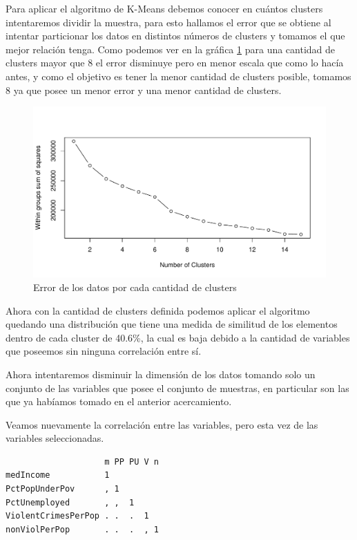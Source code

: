 \documentclass[a4paper,10pt,twocolumn]{article}
\begin{document}
	Para aplicar el algoritmo de K-Means debemos conocer en cuántos clusters intentaremos dividir la muestra, para esto hallamos el error que se obtiene al intentar particionar los datos en distintos números de clusters y tomamos el que mejor relación tenga. Como podemos ver en la gráfica \ref{fig:cluster_n_1} para una cantidad de clusters mayor que 8 el error disminuye pero en menor escala que como lo hacía antes, y como el objetivo es tener la menor cantidad de clusters posible, tomamos 8 ya que posee un menor error y una menor cantidad de clusters.

	\begin{figure}[htb]
		\begin{center}
			\includegraphics[width=\columnwidth]{figures/cluster_n_1.pdf}
		\end{center}
		\caption{Error de los datos por cada cantidad de clusters \label{fig:cluster_n_1}}%
	\end{figure}

	Ahora con la cantidad de clusters definida podemos aplicar el algoritmo quedando una distribución que tiene una medida de similitud de los elementos dentro de cada cluster de 40.6\%, la cual es baja debido a la cantidad de variables que poseemos sin ninguna correlación entre sí.

	Ahora intentaremos disminuir la dimensión de los datos tomando solo un conjunto de las variables que posee el conjunto de muestras, en particular son las que ya habíamos tomado en el anterior acercamiento.

	Veamos nuevamente la correlación entre las variables, pero esta vez de las variables seleccionadas.

	\begin{verbatim}
                    m PP PU V n
medIncome           1          
PctPopUnderPov      , 1        
PctUnemployed       , ,  1     
ViolentCrimesPerPop . .  .  1  
nonViolPerPop       . .  .  , 1
	\end{verbatim}
\end{document}
